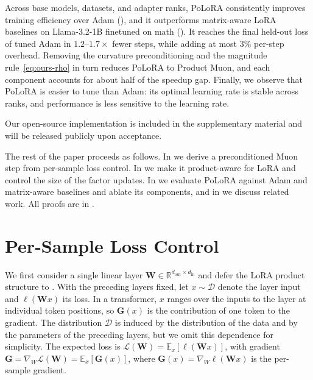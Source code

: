 \documentclass{article}
\newif\ificlr\iclrtrue
\newcommand{\mat}[1]{\bm{#1}}
\newcommand{\cD}{\mathcal{D}}
\newcommand{\cL}{\mathcal{L}}
\newcommand{\R}{\mathbb{R}}
\newcommand{\EE}[2]{\mathbb{E}_{#1}\left[#2\right] }
\newcommand{\norm}[1]{\| #1\|}
\newcommand{\methodname}{PoLoRA\xspace}
\begin{document}
Across base models, datasets, and adapter ranks, \methodname{} consistently improves training efficiency over Adam (), and it outperforms matrix-aware LoRA baselines on Llama-3.2-1B finetuned on math (). It reaches the final held-out loss of tuned Adam in $1.2$--$1.7\times$ fewer steps, while adding at most 3\% per-step overhead. Removing the curvature preconditioning and the magnitude rule~\eqref{eq:ours-rho} in turn reduces \methodname{} to Product Muon, and each component accounts for about half of the speedup gap. Finally, we observe that \methodname{} is easier to tune than Adam: its optimal learning rate is stable across ranks, and performance is less sensitive to the learning rate.

\ificlr
Our open-source implementation is included in the supplementary material and
will be released publicly upon acceptance.
\else
Our open-source implementation is available at:
\begin{quote}\centering
\url{https://github.com/nikhilgsh/polora}
\end{quote}
\fi

The rest of the paper proceeds as follows. In  we derive a preconditioned Muon step from per-sample loss control. In  we make it product-aware for LoRA and control the size of the factor updates. In  we evaluate \methodname{} against Adam and matrix-aware baselines and ablate its components, and in  we discuss related work. All proofs are in . 





\section{Per-Sample Loss Control}\label{sec:sample-loss-lmo}
We first consider a single linear layer 
$\mat{W} \in \R^{d_{\mathrm{out}} \times d_{\mathrm{in}}}$ 
and defer the LoRA product structure to . 
With the preceding layers fixed, let $x\sim\cD$ denote the 
layer input and $\ell(\mat{W}x)$ its loss. 
In a transformer, $x$ ranges over the inputs to the layer at individual token positions, so $\mat{G}(x)$ is the contribution of one token to the gradient.
The distribution $\cD$ is induced by the distribution of the data and by the parameters of the preceding layers, but we omit this dependence for simplicity.
The expected loss 
is $\cL(\mat{W})=\EE{x}{\ell(\mat{W}x)}$, 
with gradient $\mat{G}=\nabla_W\cL(\mat{W})=\EE{x}{\mat{G}(x)}$, 
where $\mat{G}(x)=\nabla_W\ell(\mat{W}x)$ is the per-sample gradient.
  
\end{document}

